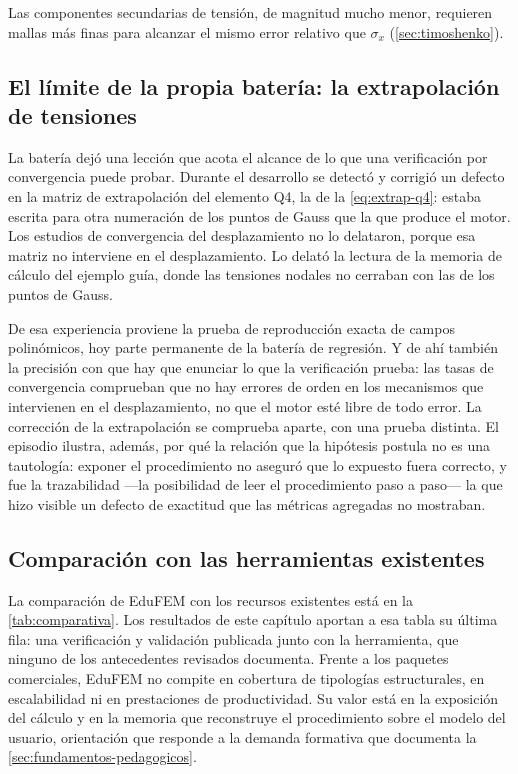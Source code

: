Las componentes secundarias de tensión, de magnitud mucho menor, requieren mallas más finas para alcanzar el mismo error relativo que $\sigma_x$ (\autoref{sec:timoshenko}).

\subsection{El límite de la propia batería: la extrapolación de tensiones}
\label{sec:leccion-extrapolacion}

La batería dejó una lección que acota el alcance de lo que una verificación por convergencia puede probar. Durante el desarrollo se detectó y corrigió un defecto en la matriz de extrapolación del elemento Q4, la de la \autoref{eq:extrap-q4}: estaba escrita para otra numeración de los puntos de Gauss que la que produce el motor. Los estudios de convergencia del desplazamiento no lo delataron, porque esa matriz no interviene en el desplazamiento. Lo delató la lectura de la memoria de cálculo del ejemplo guía, donde las tensiones nodales no cerraban con las de los puntos de Gauss.

De esa experiencia proviene la prueba de reproducción exacta de campos polinómicos, hoy parte permanente de la batería de regresión. Y de ahí también la precisión con que hay que enunciar lo que la verificación prueba: las tasas de convergencia comprueban que no hay errores de orden en los mecanismos que intervienen en el desplazamiento, no que el motor esté libre de todo error. La corrección de la extrapolación se comprueba aparte, con una prueba distinta. El episodio ilustra, además, por qué la relación que la hipótesis postula no es una tautología: exponer el procedimiento no aseguró que lo expuesto fuera correcto, y fue la trazabilidad —la posibilidad de leer el procedimiento paso a paso— la que hizo visible un defecto de exactitud que las métricas agregadas no mostraban.

\subsection{Comparación con las herramientas existentes}

La comparación de EduFEM con los recursos existentes está en la \autoref{tab:comparativa}. Los resultados de este capítulo aportan a esa tabla su última fila: una verificación y validación publicada junto con la herramienta, que ninguno de los antecedentes revisados documenta. Frente a los paquetes comerciales, EduFEM no compite en cobertura de tipologías estructurales, en escalabilidad ni en prestaciones de productividad. Su valor está en la exposición del cálculo y en la memoria que reconstruye el procedimiento sobre el modelo del usuario, orientación que responde a la demanda formativa que documenta la \autoref{sec:fundamentos-pedagogicos}.

